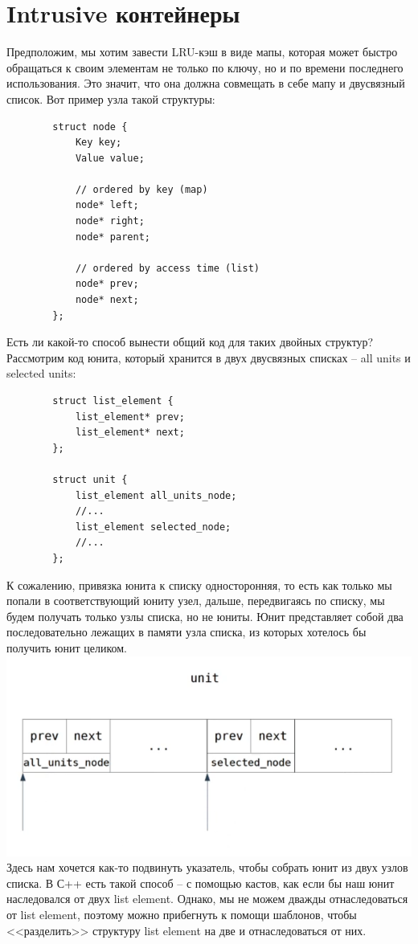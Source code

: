 \documentclass[12pt, a4paper]{article}
\begin{document}
	\section{Intrusive контейнеры}
	Предположим, мы хотим завести LRU-кэш в виде мапы, которая может быстро обращаться к своим элементам не только по ключу, но и по времени последнего использования. Это значит, что она должна совмещать в себе мапу и двусвязный список. Вот пример узла такой структуры:
	\begin{verbatim}
		struct node {
			Key key;
			Value value;
			
			// ordered by key (map)
			node* left;
			node* right;
			node* parent;
			
			// ordered by access time (list)
			node* prev;
			node* next;
		};
	\end{verbatim}
	Есть ли какой-то способ вынести общий код для таких двойных структур? Рассмотрим код юнита, который хранится в двух двусвязных списках -- all units и selected units:
	\begin{verbatim}
		struct list_element {
			list_element* prev;
			list_element* next;
		};
		
		struct unit {
			list_element all_units_node;
			//...
			list_element selected_node;
			//...
		};
	\end{verbatim}
	К сожалению, привязка юнита к списку односторонняя, то есть как только мы попали в соответствующий юниту узел, дальше, передвигаясь по списку, мы будем получать только узлы списка, но не юниты. Юнит представляет собой два последовательно лежащих в памяти узла списка, из которых хотелось бы получить юнит целиком. \\
	\includegraphics[scale=0.5]{unit.png}\\
	Здесь нам хочется как-то подвинуть указатель, чтобы собрать юнит из двух узлов списка. В С++ есть такой способ -- с помощью кастов, как если бы наш юнит наследовался от двух list element. Однако, мы не можем дважды отнаследоваться от list element, поэтому можно прибегнуть к помощи шаблонов, чтобы <<разделить>> структуру list element на две и отнаследоваться от них.
\end{document}
